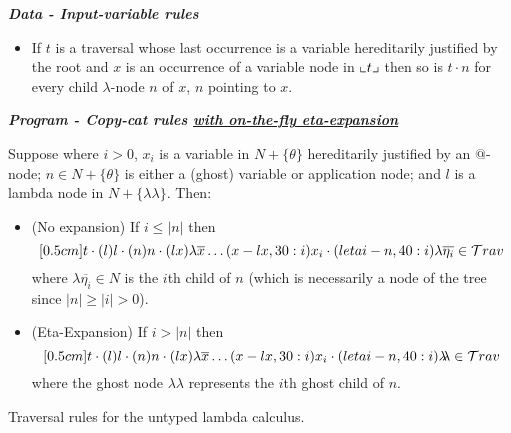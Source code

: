 \documentclass{article}
\theoremstyle{definition}
\newcommand\Nodes{N}%
\newcommand{\ghostlmd}{{\lambda\!\!\lambda}}
\newcommand{\ghostvar}{\theta}
\begin{document}
\begin{FramedTable}
\emph{\bf Data - Input-variable rules}


\begin{itemize}[]
\item {} If $t$ is a traversal whose last occurrence is a variable hereditarily justified by the root and $x$ is an occurrence of a variable node in $\llcorner t \lrcorner$ then
so is $t \cdot n$ for every child $\lambda$-node $n$ of $x$, $n$
pointing to $x$.
\end{itemize}

\emph{\bf Program - Copy-cat rules \underline{with on-the-fly eta-expansion}}

Suppose  where $i>0$, $x_i$ is a variable in $\Nodes + \{ \ghostvar\}$ hereditarily justified by an $@$-node; $n \in \Nodes + \{ \ghostvar \}$ is either a (ghost) variable or application node; and $l$ is a lambda node in $\Nodes + \{\ghostlmd\}$. Then:

\begin{itemize}
  \item {} (No expansion) If $i \leq |n|$ then
  $$\Pstr[0.5cm]{ t \cdot(l){l} \cdot
(n){n} \cdot (lx){\lambda \overline{x}}  \ldots (x-lx,30:i){x_i}
    \cdot (letai-n,40:i){\lambda \overline{\eta_i}}
     \in\travset}$$
where $\lambda \overline{\eta_i} \in N$ is the $i$th child of $n$ (which is necessarily a node of the tree since $|n|\geq|i|>0$).

\item {} (Eta-Expansion) If $i > |n|$ then
  $$\Pstr[0.5cm]{ t \cdot(l){l} \cdot
(n){n} \cdot (lx){\lambda \overline{x}}  \ldots (x-lx,30:i){x_i}
    \cdot (letai-n,40:i){\ghostlmd}
     \in\travset}$$    
     where the ghost node $\ghostlmd$ represents the $i$th ghost child of $n$.
\end{itemize}

\caption{Traversal rules for the untyped lambda calculus.}
 \label{tab:trav_rules}
\end{FramedTable}




\end{document}
